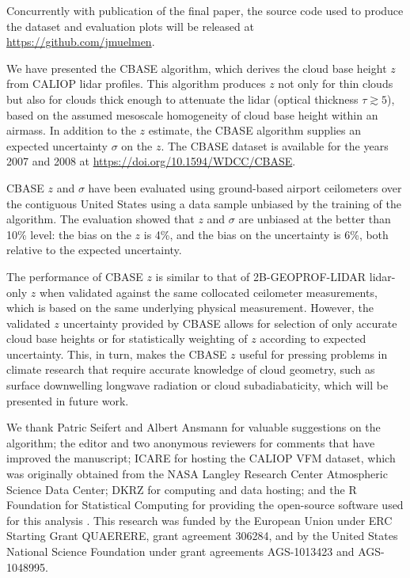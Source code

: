 \documentclass[essd,manuscript]{copernicus}
\begin{document}
Concurrently with publication of the final paper, the
source code used to produce the dataset and evaluation plots will be released
at \url{https://github.com/jmuelmen}.

\conclusions
\label{sec:conclusions}

We have presented the CBASE algorithm, which derives the cloud base height \ensuremath{z}{} from CALIOP lidar
profiles.  This algorithm produces \ensuremath{z}{} not only for thin clouds but also for
clouds thick enough to attenuate the lidar (optical thickness $\tau \gtrsim 5$),
based on the assumed mesoscale homogeneity of cloud base height within an
airmass.  In addition to the \ensuremath{z}{} estimate, the CBASE algorithm supplies an
expected uncertainty $\sigma$ on the \ensuremath{z}{}.  The CBASE dataset is available for the years 2007
and 2008 at \url{https://doi.org/10.1594/WDCC/CBASE}.

CBASE \ensuremath{z}{} and $\sigma$ have been evaluated using
ground-based airport ceilometers over the contiguous United States using a
data sample unbiased by the training of the algorithm.  The evaluation showed that
\ensuremath{z}{} and $\sigma$ are unbiased at the better
than 10\% level: the bias on the \ensuremath{z}{} is %
4\%,
and the bias on the uncertainty is %
6\%, both relative to the expected uncertainty.

The performance of CBASE \ensuremath{z}{} is similar to that of 2B-GEOPROF-LIDAR
lidar-only \ensuremath{z}{} when validated against the same collocated ceilometer measurements, which is based on the same underlying physical measurement.
However, the validated \ensuremath{z}{} uncertainty provided by CBASE allows for selection
of only accurate cloud base heights or for statistically weighting of \ensuremath{z}{}
according to expected uncertainty.  This, in turn, makes the CBASE \ensuremath{z}{} useful
for pressing problems in climate research that require accurate knowledge of
cloud geometry, such as surface downwelling longwave radiation or cloud
subadiabaticity, which will be presented in future work.

\begin{acknowledgements}
  We thank Patric Seifert and Albert Ansmann for valuable suggestions on the
  algorithm; the editor and two anonymous reviewers for comments that have
  improved the manuscript; ICARE for hosting the CALIOP VFM dataset, which was
  originally obtained from the NASA Langley Research Center Atmospheric Science
  Data Center; DKRZ for computing and data hosting; and the R Foundation for
  Statistical Computing for providing the open-source software used for this
  analysis \citep{R}.  This research was funded by the European Union under ERC Starting
  Grant QUAERERE, grant agreement 306284, and by the United States National
  Science Foundation under grant agreements AGS-1013423 and AGS-1048995.
\end{acknowledgements}
\end{document}
